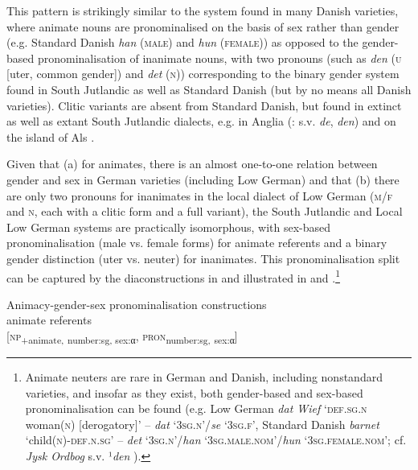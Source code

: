 \documentclass[output=paper]{langsci/langscibook}
\begin{document}
This pattern is strikingly similar to the system found in many Danish varieties, where animate nouns are pronominalised on the basis of sex rather than gender (e.g. Standard Danish \textit{han} (\textsc{male}) and \textit{hun} (\textsc{female})) as opposed to the gender-based pronominalisation of inanimate nouns, with two pronouns (such as \textit{den} (\textsc{u} {[}uter, common gender{]}) and \textit{det} (\textsc{n})) corresponding to the binary gender system found in South Jutlandic as well as Standard Danish (but by no means all Danish varieties). Clitic variants are absent from Standard Danish, but found in extinct as well as extant South Jutlandic dialects, e.g. in Anglia (\citealt{JulNielsen.1995}: s.v. \textit{de}, \textit{den}) and on the island of Als \citep[24]{Jorgensen.1950}.

Given that (a) for animates, there is an almost one-to-one relation between gender and sex in German varieties (including Low German) and that (b) there are only two pronouns for inanimates in the local dialect of Low German (\textsc{m/f} and \textsc{n}, each with a clitic form and a full variant), the South Jutlandic and Local Low German systems are practically isomorphous, with sex-based pronominalisation (male vs. female forms) for animate referents and a binary gender distinction (uter vs. neuter) for inanimates. This pronominalisation split{} can be{} captured by the diaconstructions in  and illustrated in  and .\footnote{Animate neuters are rare in German and Danish, including nonstandard varieties, and insofar as they exist, both gender-based and sex-based pronominalisation can be found (e.g. Low German \textit{dat Wief} ‘\textsc{def.sg.n} woman(\textsc{n}) {[}derogatory{]}’ – \textit{dat} ‘\textsc{3sg.n}’/\textit{se} ‘\textsc{3sg.f}’, Standard Danish \textit{barnet} ‘child(\textsc{n})-\textsc{def.n.sg’} – \textit{det} ‘\textsc{3sg.n}’/\textit{han} ‘\textsc{3sg.male.nom}’/\textit{hun} ‘\textsc{3sg.female.nom}’; cf. \textit{Jysk Ordbog} s.v. ¹\textit{den} ).}


\ea
\label{ex:hoeder:12}
Animacy-gender-sex pronominalisation constructions\\

	\ea\label{ex:hoeder:12a}
	animate referents\\
       {[}\textsc{np}\textsubscript{+animate,} \textsubscript{number:sg}\textsubscript{, sex:}{\textsubscript{α}}, \textsc{pron}\textsubscript{number:sg,} {\textsubscript{sex:}\textsubscript{α}}{]}
       
\end{document}
